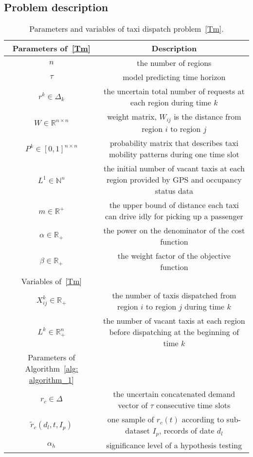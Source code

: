 \documentclass[10pt,twocolumn,twoside,english]{IEEEtran}
\begin{document}
\subsection{Problem description}
\label{network_model}
\begin{table*}
\centering
\begin{tabular}{|c|c|}
  \hline
  Parameters of~\eqref{Tm}&Description \\ \hline
$n$ & the number of regions\\ \hline    
  $\tau$ & model predicting time horizon\\ \hline   
   $r^k \in \Delta_k $ & the uncertain total number of requests at each region during time $k$ \\ \hline
   $W \in \mathbb{R}^{n \times n}$ & weight matrix, $W_{ij}$ is the distance from region $i$ to region $j$  \\ \hline
   $P^k \in [0,1]^{n \times n}$ & probability matrix that describes taxi mobility patterns during one time slot\\ \hline $L^1 \in \mathbb{N}^{n}$ & the initial number of vacant taxis at each region provided by GPS and occupancy status data\\ \hline
   $m \in \mathbb{R}^+$ & the upper bound of distance each taxi can drive idly for picking up a passenger \\ \hline
$\alpha \in \mathbb{R}_+$ & the power on the denominator of the cost function \\ \hline
   $\beta \in \mathbb{R}_+$ & the weight factor of the objective function \\ \hline  
Variables of~\eqref{Tm}&      \\ \hline    
      $X_{ij}^k \in \mathbb{R}_+$ &  the number of taxis dispatched from region $i$ to region $j$ during time $k$\\ \hline     
      $L^k \in \mathbb{R}^n_+$ & the number of vacant taxis at each region before dispatching at the beginning of time $k$ \\ \hline
       Parameters of Algorithm~\ref{alg: algorithm_1}&          \\ \hline  
$r_c \in \Delta$ & the uncertain concatenated demand vector of $\tau$ consecutive time slots\\ \hline
$\tilde{r}_c(d_l, t, I_p)$ & one sample of $r_c (t)$ according to sub-dataset $I_p$, records of date $d_l$ \\\hline
$\alpha_h$ & significance level of a hypothesis testing \\ \hline
\end{tabular}
\caption{Parameters and variables of taxi dispatch problem~\eqref{Tm}.}
\label{T1_parameter}
\vspace{-22pt}
\end{table*} 
\end{document}
